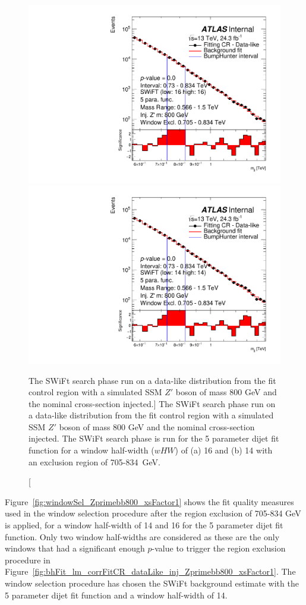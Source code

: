 \begin{figure}[!htb]
\captionsetup[subfigure]{aboveskip=0pt,justification=centering}
\centering
{} {
  \includegraphics[width=0.45\linewidth, angle=0]{figs/Dibjet/LowMass/FitStudy_min566/bhFit_corrFitCR_dataLike_5para_low16_high16_inj_Zprimebb800_xsFactor1_removedWindow.pdf}
}
 {
  \includegraphics[width=0.45\linewidth, angle=0]{figs/Dibjet/LowMass/FitStudy_min566/bhFit_corrFitCR_dataLike_5para_low14_high14_inj_Zprimebb800_xsFactor1_removedWindow.pdf}
}

\caption
    [The SWiFt search phase run on a data-like distribution
      from the fit control region with a simulated SSM $Z'$ boson of mass 800 GeV and the nominal cross-section injected.]
    {\label{fig:bhFit_lm_corrFitCR_dataLike_inj_Zprimebb800_xsFactor1_removedWindow}
      The SWiFt search phase run on a data-like distribution
      from the fit control region with a simulated SSM $Z'$ boson of mass 800 GeV and the nominal cross-section injected.
      The SWiFt search phase is run for the 5 parameter dijet fit function for a window half-width ($wHW$) of (a) 16 and (b) 14
      with an exclusion region of 705-834~GeV.}
\end{figure}

Figure~\ref{fig:windowSel_Zprimebb800_xsFactor1} shows the fit quality measures used in the window selection procedure after the region exclusion of 705-834 GeV is applied,
for a window half-width of 14 and 16 for the 5 parameter dijet fit function.
Only two window half-widths are considered as these are the only windows that had a significant enough $p$-value to trigger the region exclusion procedure in
Figure~\ref{fig:bhFit_lm_corrFitCR_dataLike_inj_Zprimebb800_xsFactor1}.
The window selection procedure has chosen the SWiFt background estimate with the 5 parameter dijet fit function and a window half-width of 14.

